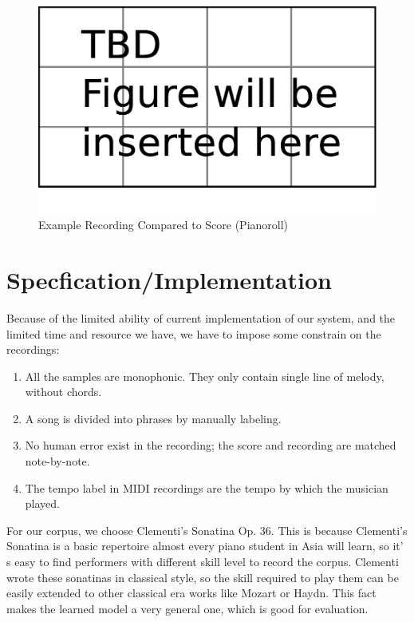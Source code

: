 \begin{figure}[tp]
   \begin{center}
      \includegraphics[width=\textwidth]{fig/TBDFigure}

   \end{center}
   \caption{Example Recording Compared to Score (Pianoroll)}
   \label{fig:exprecording}
\end{figure}


\section{Specfication/Implementation}

Because of the limited ability of current implementation of our system, and the limited time and resource we have, we have to impose some constrain on the recordings:
\begin{enumerate}
   \item All the samples are monophonic. They only contain single line of melody, without chords.
   \item A song is divided into phrases by manually labeling.
   \item No human error exist in the recording; the score and recording are matched note-by-note.
   \item The tempo label in MIDI recordings are the tempo by which the musician played. 
\end{enumerate}

For our corpus, we choose Clementi's Sonatina Op. 36.  This is because  Clementi's Sonatina is a basic repertoire almost every piano student in Asia will learn, so it' s easy to find performers with different skill level to record the corpus. Clementi wrote these sonatinas in classical style, so the skill required to play them can be easily extended to other classical era works like Mozart or Haydn. This fact makes the learned model a very general one, which is good for evaluation.

